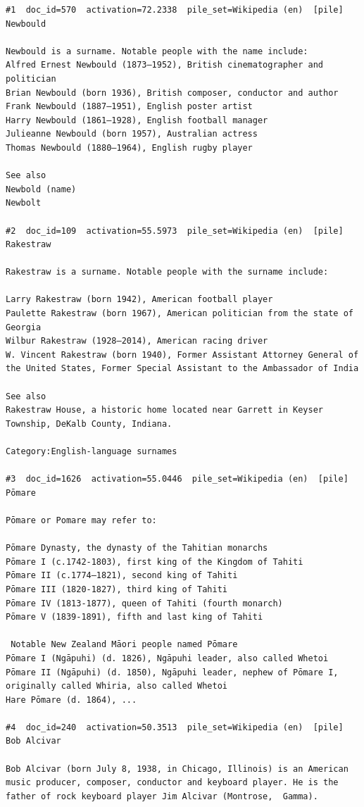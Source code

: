 \begin{verbatim}
#1  doc_id=570  activation=72.2338  pile_set=Wikipedia (en)  [pile]
Newbould

Newbould is a surname. Notable people with the name include:
Alfred Ernest Newbould (1873–1952), British cinematographer and politician
Brian Newbould (born 1936), British composer, conductor and author
Frank Newbould (1887–1951), English poster artist
Harry Newbould (1861–1928), English football manager
Julieanne Newbould (born 1957), Australian actress
Thomas Newbould (1880–1964), English rugby player

See also
Newbold (name)
Newbolt

#2  doc_id=109  activation=55.5973  pile_set=Wikipedia (en)  [pile]
Rakestraw

Rakestraw is a surname. Notable people with the surname include:

Larry Rakestraw (born 1942), American football player
Paulette Rakestraw (born 1967), American politician from the state of Georgia
Wilbur Rakestraw (1928–2014), American racing driver
W. Vincent Rakestraw (born 1940), Former Assistant Attorney General of the United States, Former Special Assistant to the Ambassador of India

See also
Rakestraw House, a historic home located near Garrett in Keyser Township, DeKalb County, Indiana.

Category:English-language surnames

#3  doc_id=1626  activation=55.0446  pile_set=Wikipedia (en)  [pile]
Pōmare

Pōmare or Pomare may refer to:

Pōmare Dynasty, the dynasty of the Tahitian monarchs
Pōmare I (c.1742-1803), first king of the Kingdom of Tahiti
Pōmare II (c.1774–1821), second king of Tahiti
Pōmare III (1820-1827), third king of Tahiti
Pōmare IV (1813-1877), queen of Tahiti (fourth monarch)
Pōmare V (1839-1891), fifth and last king of Tahiti

 Notable New Zealand Māori people named Pōmare
Pōmare I (Ngāpuhi) (d. 1826), Ngāpuhi leader, also called Whetoi
Pōmare II (Ngāpuhi) (d. 1850), Ngāpuhi leader, nephew of Pōmare I, originally called Whiria, also called Whetoi
Hare Pōmare (d. 1864), ...

#4  doc_id=240  activation=50.3513  pile_set=Wikipedia (en)  [pile]
Bob Alcivar

Bob Alcivar (born July 8, 1938, in Chicago, Illinois) is an American music producer, composer, conductor and keyboard player. He is the father of rock keyboard player Jim Alcivar (Montrose,  Gamma).


\end{verbatim}
